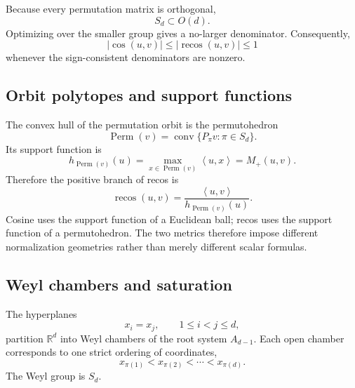 \documentclass[11pt,a4paper]{article}
\newcommand{\R}{\mathbb{R}}
\newcommand{\Sd}{S_d}
\newcommand{\Od}{O(d)}
\newcommand{\ip}[2]{\left\langle #1,#2\right\rangle}
\newcommand{\recos}{\operatorname{recos}}
\newcommand{\cosim}{\operatorname{cos}}
\newcommand{\Perm}{\operatorname{Perm}}
\newcommand{\conv}{\operatorname{conv}}
\begin{document}
Because every permutation matrix is orthogonal,
\begin{equation}
    \Sd\subset\Od.
\end{equation}
Optimizing over the smaller group gives a no-larger denominator. Consequently,
\begin{equation}
    |\cosim(u,v)|\leq |\recos(u,v)|\leq 1
\end{equation}
whenever the sign-consistent denominators are nonzero.

\subsection{Orbit polytopes and support functions}

The convex hull of the permutation orbit is the permutohedron
\begin{equation}
    \Perm(v)=\conv\{P_\pi v:\pi\in\Sd\}.
\end{equation}
Its support function is
\begin{equation}
    h_{\Perm(v)}(u)
    =\max_{x\in\Perm(v)}\ip{u}{x}
    =M_+(u,v).
\end{equation}
Therefore the positive branch of recos is
\begin{equation}
    \recos(u,v)=\frac{\ip{u}{v}}{h_{\Perm(v)}(u)}.
\end{equation}
Cosine uses the support function of a Euclidean ball; recos uses the support function of a permutohedron. The two metrics therefore impose different normalization geometries rather than merely different scalar formulas.

\subsection{Weyl chambers and saturation}

The hyperplanes
\begin{equation}
    x_i=x_j,
    \qquad 1\leq i<j\leq d,
\end{equation}
partition $\R^d$ into Weyl chambers of the root system $A_{d-1}$. Each open chamber corresponds to one strict ordering of coordinates,
\begin{equation}
    x_{\pi(1)}<x_{\pi(2)}<\cdots<x_{\pi(d)}.
\end{equation}
The Weyl group is $\Sd$.
\end{document}
